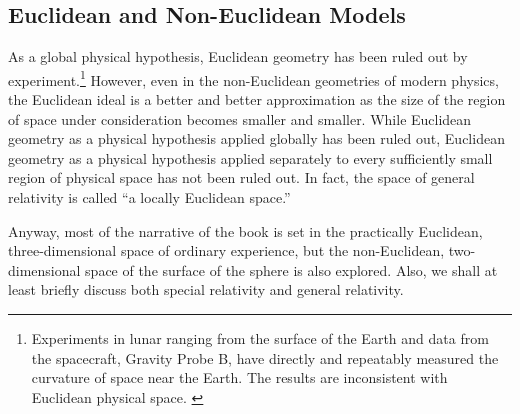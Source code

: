 \subsection{Euclidean and Non-Euclidean Models}

As a global physical hypothesis, Euclidean geometry has been ruled out by
experiment.\footnote{%
   Experiments in lunar ranging from the surface of the Earth and data from the
   spacecraft, Gravity Probe B, have directly and repeatably measured the
   curvature of space near the Earth. The results are inconsistent with
   Euclidean physical space.  \citep{gpb-2011, miller-geodetic}
}
However, even in the non-Euclidean geometries of modern physics, the Euclidean
ideal is a better and better approximation as the size of the region of space
under consideration becomes smaller and smaller.  While Euclidean geometry as a
physical hypothesis applied globally has been ruled out, Euclidean geometry as
a physical hypothesis applied separately to every sufficiently small region of
physical space has not been ruled out.  In fact, the space of general
relativity is called ``a locally Euclidean space.''

Anyway, most of the narrative of the book is set in the practically Euclidean,
three-dimensional space of ordinary experience, but the non-Euclidean,
two-dimensional space of the surface of the sphere is also explored.  Also, we
shall at least briefly discuss both special relativity and general relativity.

